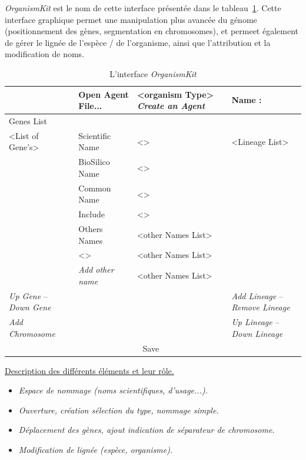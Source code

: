 \documentclass[11pt,twoside,a4paper]{article}
\begin{document}
\emph{OrganismKit} est le nom de cette interface pr{\'e}sent{\'e}e dans le tableau~\ref{tab:OrganismKit}. Cette interface graphique permet une manipulation plus avanc{\'e}e du g{\'e}nome (positionnement des g{\`e}nes, segmentation en chromosomes), et permeet {\'e}galement de g{\'e}rer le lign{\'e}e de l'esp{\`e}ce / de l'organisme, ainsi que l'attribution et la modification de noms. 


\begin{table}[h]
	\centering
	\begin{scriptsize}
	\begin{tabular}{|l|l|l|l|}
	\hline
				& Open Agent File...	& <organism Type> \emph{Create an Agent} & Name : 	   	     \\
	\hline
	Genes List		& \multicolumn{3}{|c|}{~}							 	     \\
				\cline{2-4}
	<List of Gene's>	& Scientific Name		& <>				 & <Lineage List>	     \\
				& BioSilico Name		& <>				 & 			     \\
				& Common Name			& <>				 & 			     \\
				& Include			& <>				 & 			     \\
				\cline{2-3}
				& Others Names			& <other Names List>		 & 			     \\
				& <>				& <other Names List>		 & 			     \\
				& \emph{Add other name}		& <other Names List>		 & 			     \\
	\hline
	\emph{Up Gene} -- \emph{Down Gene} & \multicolumn{2}{|c|}{~}		& \emph{Add Lineage} -- \emph{Remove Lineage} \\
	\emph{Add Chromosome}		& \multicolumn{2}{|c|}{~}		& \emph{Up Lineage}  -- \emph{Down Lineage}   \\
	\hline
				& \multicolumn{2}{|c|}{Save}					& 		      \\
	\hline
	\end{tabular}
	\caption[L'interface \emph{OrganismKit}]{L'interface \emph{OrganismKit}}
	\label{tab:OrganismKit}
	\end{scriptsize}
\end{table}

\underline{Description des diff{\'e}rents {\'e}l{\'e}ments et leur r{\^o}le. }
\begin{itemize}
	\item \emph{Espace de nommage (noms scientifiques, d'usage...). }
	\item \emph{Ouverture, cr{\'e}ation s{\'e}lection du type, nommage simple. }
	\item \emph{D{\'e}placement des g{\`e}nes, ajout indication de s{\'e}parateur de chromosome. }
	\item \emph{Modification de lign{\'e}e (esp{\`e}ce, organisme). }
\end{itemize}
\end{document}
